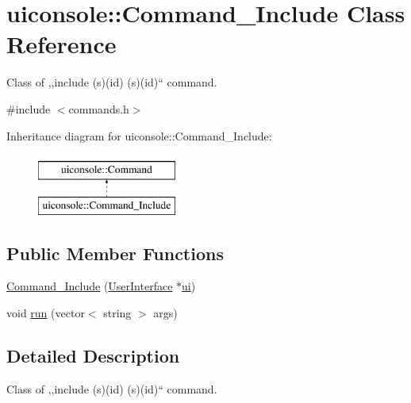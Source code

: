 \hypertarget{classuiconsole_1_1Command__Include}{
\section{uiconsole::Command\_\-Include Class Reference}
\label{dc/d64/classuiconsole_1_1Command__Include}
}


Class of ,,include (s)(id) (s)(id)`` command.  




{\ttfamily \#include $<$commands.h$>$}

Inheritance diagram for uiconsole::Command\_\-Include:\begin{figure}[H]
\begin{center}
\leavevmode
\includegraphics[height=2.000000cm]{dc/d64/classuiconsole_1_1Command__Include}
\end{center}
\end{figure}
\subsection*{Public Member Functions}
\begin{DoxyCompactItemize}
\item 
\hyperlink{classuiconsole_1_1Command__Include_a28041e8559bf57e3bcef5f7f2c116181}{Command\_\-Include} (\hyperlink{classUserInterface}{UserInterface} $\ast$\hyperlink{classuiconsole_1_1Command_ab43ed5152860c099f858d62f9f556699}{ui})
\item 
void \hyperlink{classuiconsole_1_1Command__Include_ac4a0f5366a1fbf8d118bde8c5f55e633}{run} (vector$<$ string $>$ args)
\end{DoxyCompactItemize}


\subsection{Detailed Description}
Class of ,,include (s)(id) (s)(id)`` command. 

